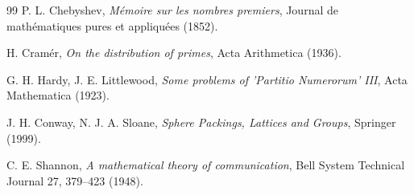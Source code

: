 \documentclass[12pt,a4paper]{article}
\begin{document}
\begin{thebibliography}{99}
		P. L. Chebyshev, \emph{Mémoire sur les nombres premiers}, Journal de mathématiques pures et appliquées (1852).
		
		H. Cramér, \emph{On the distribution of primes}, Acta Arithmetica (1936).
		
		G. H. Hardy, J. E. Littlewood, \emph{Some problems of 'Partitio Numerorum' III}, Acta Mathematica (1923).
		
		J. H. Conway, N. J. A. Sloane, \emph{Sphere Packings, Lattices and Groups}, Springer (1999).
		
		C. E. Shannon, \emph{A mathematical theory of communication}, Bell System Technical Journal 27, 379--423 (1948).
		
	\end{thebibliography}
	
\end{document}
